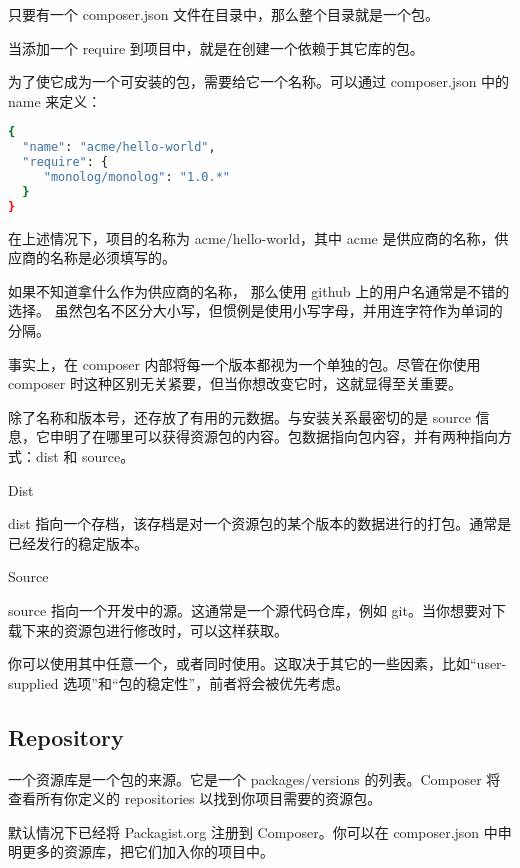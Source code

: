 只要有一个 composer.json 文件在目录中，那么整个目录就是一个包。

当添加一个 require 到项目中，就是在创建一个依赖于其它库的包。


为了使它成为一个可安装的包，需要给它一个名称。可以通过 composer.json 中的 name 来定义：



\begin{lstlisting}[language=bash]
{
  "name": "acme/hello-world",
  "require": {
     "monolog/monolog": "1.0.*"
  }
}
\end{lstlisting}


在上述情况下，项目的名称为 acme/hello-world，其中 acme 是供应商的名称，供应商的名称是必须填写的。


如果不知道拿什么作为供应商的名称， 那么使用 github 上的用户名通常是不错的选择。 虽然包名不区分大小写，但惯例是使用小写字母，并用连字符作为单词的分隔。

事实上，在 composer 内部将每一个版本都视为一个单独的包。尽管在你使用 composer 时这种区别无关紧要，但当你想改变它时，这就显得至关重要。

除了名称和版本号，还存放了有用的元数据。与安装关系最密切的是 source 信息，它申明了在哪里可以获得资源包的内容。包数据指向包内容，并有两种指向方式：dist 和 source。

\begin{compactitem}
\item Dist

dist 指向一个存档，该存档是对一个资源包的某个版本的数据进行的打包。通常是已经发行的稳定版本。

\item Source

source 指向一个开发中的源。这通常是一个源代码仓库，例如 git。当你想要对下载下来的资源包进行修改时，可以这样获取。
\end{compactitem}

你可以使用其中任意一个，或者同时使用。这取决于其它的一些因素，比如“user-supplied 选项”和“包的稳定性”，前者将会被优先考虑。

\subsection{Repository}

一个资源库是一个包的来源。它是一个 packages/versions 的列表。Composer 将查看所有你定义的 repositories 以找到你项目需要的资源包。

默认情况下已经将 Packagist.org 注册到 Composer。你可以在 composer.json 中申明更多的资源库，把它们加入你的项目中。

